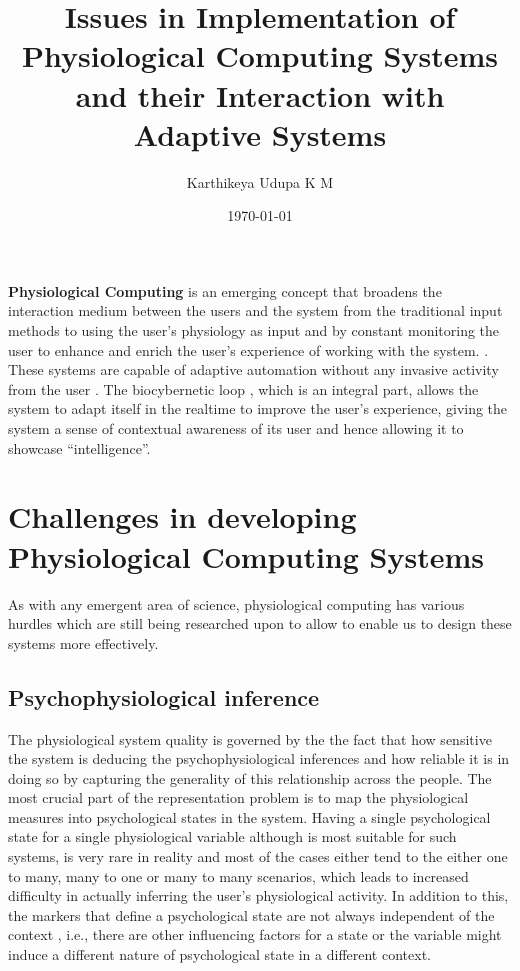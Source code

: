 \documentclass[10pt,a4paper]{article}
\title{Issues in Implementation of Physiological Computing Systems and their Interaction with Adaptive Systems}
\author{Karthikeya Udupa K M}
\date{\today}
\begin{document}
 
\maketitle
\noindent
\textbf{Physiological Computing} is an emerging concept that broadens the interaction medium between the users and the system from the traditional input methods to using the user's physiology as input and by constant monitoring the user to enhance and enrich the user's experience of working with the system. \cite{ALLANSON:2002:IEEE,AFC:2002:IWC}. These systems are capable of adaptive automation without any invasive activity from the user \cite{BEP:1996:BP}. The biocybernetic loop \cite{POPE:1995:BP}, which is an integral part, allows the system to adapt itself in the realtime to improve the user's experience, giving the system a sense of contextual awareness of its user and hence allowing it to showcase ``intelligence''.

\section{Challenges in developing Physiological Computing Systems} 
As with any emergent area of science, physiological computing has various hurdles which are still being researched upon to allow to enable us to design these systems more effectively.
\subsection{Psychophysiological inference}
\label{PSYCOP}
The physiological system quality is governed by the the fact that how sensitive the system is deducing the psychophysiological inferences and how reliable it is in doing so by capturing the generality of this relationship across the people.
The most crucial part of the representation problem is to map the physiological measures into psychological states in the system. Having a single psychological state for a single physiological variable although is most suitable for such systems, is very rare in reality and most of the cases either tend to the either one to many, many to one or many to many scenarios, which leads to increased difficulty in actually inferring the user's physiological activity. In addition to this, the markers that define a psychological state are not always independent of the context \cite{CT:1990:APYSC,CTB:2000:CUP}, i.e., there are other influencing factors for a state or the variable might induce a different nature of psychological state in a different context. 
\end{document}
